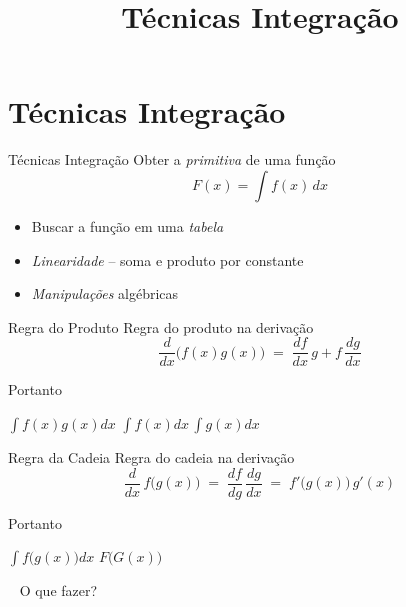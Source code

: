 \documentclass[fleqn,utf8,aspectratio=169,12pt]{beamer}
\title{Técnicas Integração}
\begin{document}
\addtitle

\section{Técnicas Integração}

\begin{frame}{Técnicas Integração}
  Obter a \emph{primitiva} de uma função
  \[
    F(x) = \int f(x)\,dx
  \]
  \pause
  \vspace{-\baselineskip}
  \begin{itemize}[<+->]
    \setlength\itemsep{1em}
    \item Buscar a função em uma \emph{tabela}
    \item \emph{Linearidade} -- soma e produto por constante
    \item \emph{Manipulações} algébricas
  \end{itemize}
\end{frame}

\begin{frame}{Regra do Produto}
  Regra do produto na derivação
  \[
    \frac{d}{dx}\big(f(x)g(x)\big) \;=\; \frac{df}{dx}\,g + f\, \frac{dg}{dx}
  \]

  \pause
  Portanto

  \vspace{5mm}
  \hspace{7mm}
  \(
    \int f(x)g(x)dx
  \)
  \;{\Large\color{red}$\neq$}\;
  \(
    \int f(x)dx\, \int g(x)dx
  \)
\end{frame}

\begin{frame}{Regra da Cadeia}
  Regra do cadeia na derivação
  \[
    \frac{d}{dx} \, f\big(g(x)\big)
    \;=\; \frac{df}{dg}\, \frac{dg}{dx}
    \;=\; f'\big(g(x)\big)\,g'(x)
  \]

  \pause
  Portanto

  \vspace{5mm}
  \hspace{7mm}
  \(
  \int f\big(g(x)\big)dx
  \)
  \;{\Large\color{red}$\neq$}\;
  \(
    F\big(G(x)\big)
  \)
\end{frame}

\begin{frame}{~}
  \Large
  O que fazer?
\end{frame}
\end{document}
